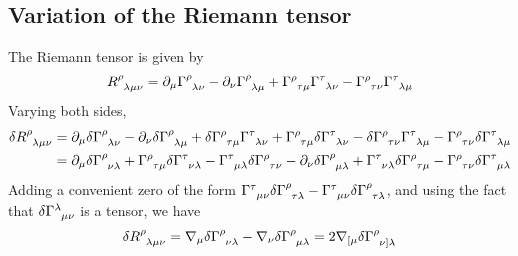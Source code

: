 \subsection{Variation of the Riemann tensor}
The Riemann tensor is given by
\begin{equation*}
    \tensor{R}{^\rho_{\lambda\mu\nu}}=\partial_\mu\tensor{\Gamma}{^\rho_{\lambda\nu}}-\partial_\nu\tensor{\Gamma}{^\rho_{\lambda\mu}}+\tensor{\Gamma}{^\rho_{\tau\mu}}\tensor{\Gamma}{^\tau_{\lambda\nu}}-\tensor{\Gamma}{^\rho_{\tau\nu}}\tensor{\Gamma}{^\tau_{\lambda\mu}}
\end{equation*}
Varying both sides,
\begin{align*}
    \delta  \tensor{R}{^\rho_{\lambda\mu\nu}}&=\partial_\mu\delta\tensor{\Gamma}{^\rho_{\lambda\nu}}-\partial_\nu\delta\tensor{\Gamma}{^\rho_{\lambda\mu}}+\delta\tensor{\Gamma}{^\rho_{\tau\mu}}\tensor{\Gamma}{^\tau_{\lambda\nu}}+\tensor{\Gamma}{^\rho_{\tau\mu}}\delta\tensor{\Gamma}{^\tau_{\lambda\nu}}-\delta\tensor{\Gamma}{^\rho_{\tau\nu}}\tensor{\Gamma}{^\tau_{\lambda\mu}}-\tensor{\Gamma}{^\rho_{\tau\nu}}\delta\tensor{\Gamma}{^\tau_{\lambda\mu}}\\
    &=\partial_\mu\delta\tensor{\Gamma}{^\rho_{\nu\lambda}}+\tensor{\Gamma}{^\rho_{\tau\mu}}\delta\tensor{\Gamma}{^\tau_{\nu\lambda}}-\tensor{\Gamma}{^\tau_{\mu\lambda}}\delta\tensor{\Gamma}{^\rho_{\tau\nu}}-\partial_\nu\delta\tensor{\Gamma}{^\rho_{\mu\lambda}}+\tensor{\Gamma}{^\tau_{\nu\lambda}}\delta\tensor{\Gamma}{^\rho_{\tau\mu}}-\tensor{\Gamma}{^\rho_{\tau\nu}}\delta\tensor{\Gamma}{^\tau_{\mu\lambda}}
\end{align*}
Adding a convenient zero of the form $\tensor{\Gamma}{^\tau_{\mu\nu}}\delta\tensor{\Gamma}{^\rho_{\tau\lambda}}-\tensor{\Gamma}{^\tau_{\mu\nu}}\delta\tensor{\Gamma}{^\rho_{\tau\lambda}}$, and using the fact that $\delta\tensor{\Gamma}{^\lambda_{\mu\nu}}$ is a tensor, we have
\begin{equation}
    \delta\tensor{R}{^\rho_{\lambda\mu\nu}}=\nabla_\mu\delta\tensor{\Gamma}{^\rho_{\nu\lambda}}-\nabla_\nu\delta\tensor{\Gamma}{^\rho_{\mu\lambda}}=2\nabla_{[\mu}\delta\tensor{\Gamma}{^\rho_{\nu]\lambda}}\label{delta Riemann}
\end{equation}




